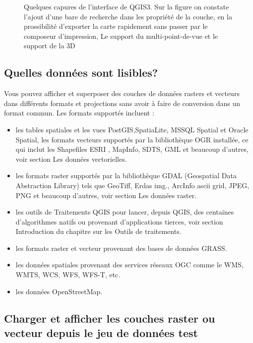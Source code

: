 \documentclass[a4paper, 11pt]{article}
\begin{document}
\begin{figure}
    \caption{Quelques capures de l'interface de QGIS3. Sur la figure  on constate l'ajout d'une bare de recherche dans les propriété de la couche, en
      la prossibilité d'exporter la carte rapidement sans passer par le composeur d'impression,  Le support du multi-point-de-vue et
      le support de la 3D}
    \label{fig:qgis3-interfaces}
  \end{figure}

  \subsection{Quelles données sont lisibles?}
  Vous pouvez afficher et superposer des couches de données rasters et vecteurs dans différents formats et projections sans avoir à faire de conversion dans un format commun. Les formats supportés incluent :
  \begin{itemize}
    \item les tables spatiales et les vues PostGIS,SpatiaLite, MSSQL Spatial et Oracle Spatial, les formats vecteurs supportés par la bibliothèque OGR installée, ce qui inclut les Shapefiles ESRI , MapInfo, SDTS, GML et beaucoup d’autres, voir section Les données vectorielles.
    \item les formats raster supportés par la bibliothèque GDAL (Geospatial Data Abstraction Library) tels que GeoTiff, Erdas img., ArcInfo ascii grid, JPEG, PNG et beaucoup d’autres, voir section Les données raster.
    \item les outils de Traitements QGIS pour lancer, depuis QGIS, des centaines d’algorithmes natifs ou provenant d’applications tierces, voir section Introduction du chapitre sur les Outils de traitements.
    \item les formats raster et vecteur provenant des bases de données GRASS.
    \item les données spatiales provenant des services réseaux OGC comme le WMS, WMTS, WCS, WFS, WFS-T, etc.
    \item les données OpenStreetMap.
  \end{itemize}
  \subsection{Charger et afficher les couches raster ou vecteur depuis le jeu de données test}
\end{document}
